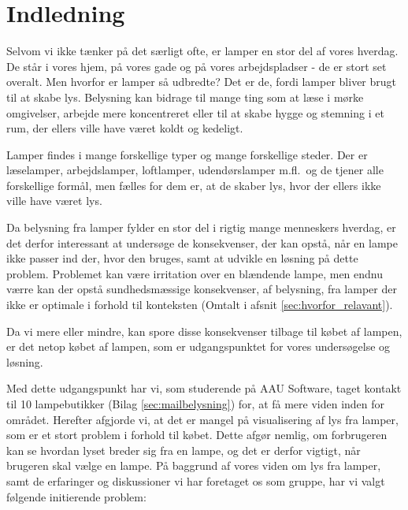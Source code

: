 \section{Indledning}
Selvom vi ikke tænker på det særligt ofte, er lamper en stor del af vores hverdag. De står i vores hjem, på vores gade og på vores arbejdspladser - de er stort set overalt. Men hvorfor er lamper så udbredte? Det er de, fordi lamper bliver brugt til at skabe lys. Belysning kan bidrage til mange ting som at læse i mørke omgivelser, arbejde mere koncentreret eller til at skabe hygge og stemning i et rum, der ellers ville have været koldt og kedeligt. 

Lamper findes i mange forskellige typer og mange forskellige steder. Der er læselamper, arbejdslamper, loftlamper, udendørslamper m.fl.\ og de tjener alle forskellige formål, men fælles for dem er, at de skaber lys, hvor der ellers ikke ville have været lys. 

Da belysning fra lamper fylder en stor del i rigtig mange menneskers hverdag, er det derfor interessant at undersøge de konsekvenser, der kan opstå, når en lampe ikke passer ind der, hvor den bruges, samt at udvikle en løsning på dette problem. Problemet kan være irritation over en blændende lampe, men endnu værre kan der opstå sundhedsmæssige konsekvenser, af belysning, fra lamper der ikke er optimale i forhold til konteksten (Omtalt i afsnit \ref{sec:hvorfor_relavant}).

Da vi mere eller mindre, kan spore disse konsekvenser tilbage til købet af lampen, er det netop købet af lampen, som er udgangspunktet for vores undersøgelse og løsning.

Med dette udgangspunkt har vi, som studerende på AAU Software, taget kontakt til 10 lampebutikker (Bilag \ref{sec:mailbelysning}) for, at få mere viden inden for området. Herefter afgjorde vi, at det er mangel på visualisering af lys fra lamper, som er et stort problem i forhold til købet. Dette afgør nemlig, om forbrugeren kan se hvordan lyset breder sig fra en lampe, og det er derfor vigtigt, når brugeren skal vælge en lampe. På baggrund af vores viden om lys fra lamper, samt de erfaringer og diskussioner vi har foretaget os som gruppe, har vi valgt følgende initierende problem:


\clearpage
